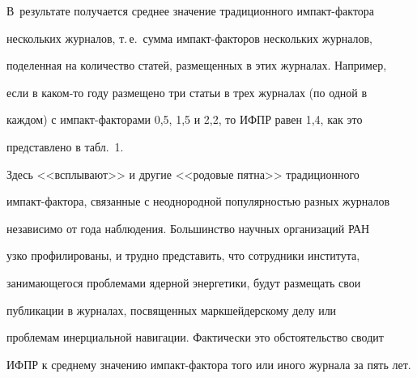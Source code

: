 В~результате получается среднее значение традиционного им\-пакт-фак\-то\-ра 


нескольких журналов, т.\,е.\ сумма им\-пакт-фак\-то\-ров нескольких журналов, 


поделенная на количество статей, размещенных в этих журналах. Например, 


если в ка\-ком-то году размещено три статьи в трех журналах (по одной в 


каждом) с им\-пакт-фак\-то\-ра\-ми 0,5, 1,5 и 2,2, то ИФПР равен 1,4, как это 


представлено в табл.~1.


    


    Здесь <<всплывают>> и другие <<родовые пятна>> традиционного 


импакт-фак\-то\-ра, связанные с неоднородной популярностью разных журналов 


независимо от года наблюдения. Большинство научных организаций РАН 


узко профилированы, и трудно представить, что сотрудники института, 


за\-ни\-ма\-юще\-го\-ся проб\-ле\-ма\-ми ядерной энергетики, будут размещать свои 


публикации в журналах, посвященных маркшейдерскому делу или 


проблемам инерциальной навигации. Фактически это обстоятельство сводит 


ИФПР к среднему значению им\-пакт-фак\-то\-ра того или иного журнала за пять лет.






